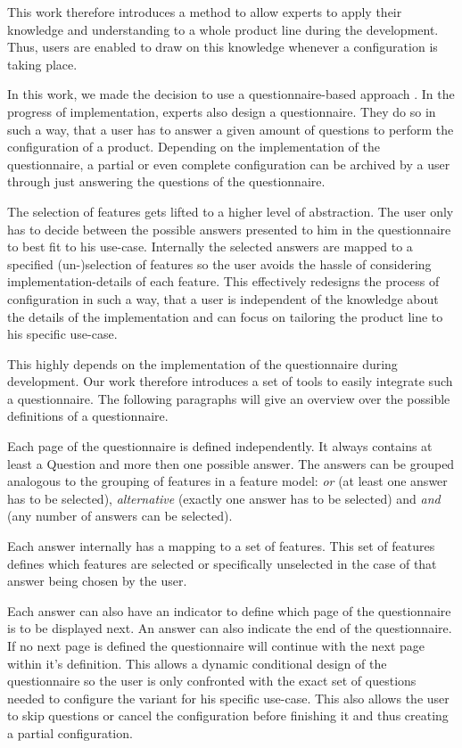 This work therefore introduces a method to allow experts to apply their knowledge and understanding to a whole product line during the development. Thus, users are enabled to draw on this knowledge whenever a configuration is taking place.

In this work, we made the decision to use a questionnaire-based approach \cite{qbvm}. In the progress of implementation, experts also design a questionnaire. They do so in such a way, that a user has to answer a given amount of questions to perform the configuration of a product. Depending on the implementation of the questionnaire, a partial or even complete configuration can be archived by a user through just answering the questions of the questionnaire.

The selection of features gets lifted to a higher level of abstraction. The user only has to decide between the possible answers presented to him in the questionnaire to best fit to his use-case. Internally the selected answers are mapped to a specified (un-)selection of features so the user avoids the hassle of considering implementation-details of each feature. This effectively redesigns the process of configuration in such a way, that a user is independent of the knowledge about the details of the implementation and can focus on tailoring the product line to his specific use-case.

This highly depends on the implementation of the questionnaire during development. Our work therefore introduces a set of tools to easily integrate such a questionnaire. The following paragraphs will give an overview over the possible definitions of a questionnaire.

Each page of the questionnaire is defined independently. It always contains at least a Question and more then one possible answer. The answers can be grouped analogous to the grouping of features in a feature model: \textit{or} (at least one answer has to be selected), \textit{alternative} (exactly one answer has to be selected) and \textit{and} (any number of answers can be selected).

Each answer internally has a mapping to a set of features. This set of features defines which features are selected or specifically unselected in the case of that answer being chosen by the user.

Each answer can also have an indicator to define which page of the questionnaire is to be displayed next. An answer can also indicate the end of the questionnaire. If no next page is defined the questionnaire will continue with the next page within it's definition. This allows a dynamic conditional design of the questionnaire so the user is only confronted with the exact set of questions needed to configure the variant for his specific use-case. This also allows the user to skip questions or cancel the configuration before finishing it and thus creating a partial configuration.

